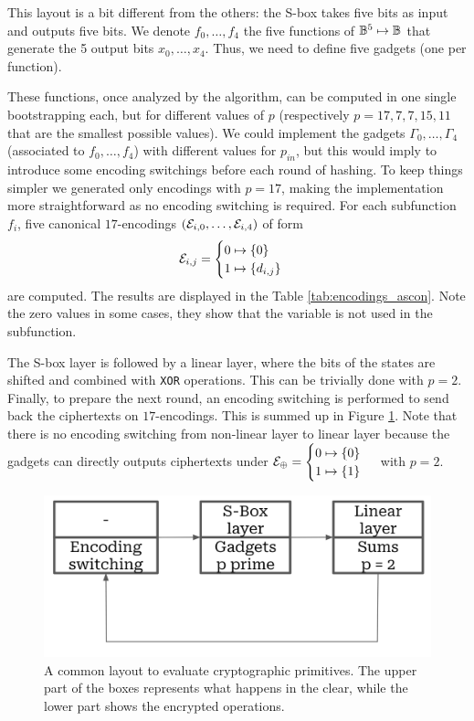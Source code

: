 This layout is a bit different from the others: the S-box takes five bits as input and outputs five bits. We denote $f_0, \dots, f_4$ the five functions of $\mathbb{B}^5 \mapsto \mathbb{B}$ that generate the 5 output bits $x_0, \dots, x_4$. Thus, we need to define five gadgets (one per function).

These functions, once analyzed by the algorithm, can be computed in one single bootstrapping each, but for different values of $p$ (respectively $p=17, 7, 7, 15, 11$ that are the smallest possible values). We could implement the gadgets $\Gamma_0, \dots, \Gamma_4$ (associated to $f_0, \dots, f_4$) with different values for $p_{in}$, but this would imply to introduce some encoding switchings before each round of hashing. To keep things simpler we generated only encodings with $p = 17$, making the implementation more straightforward as no encoding switching is required. For each subfunction $f_i$, five canonical $17$-encodings $(\mathcal{E}_{i, 0}, \dots, \mathcal{E}_{i, 4})$ of form $$\mathcal{E}_{i, j} = \begin{cases} 0 \mapsto \{0\} \\ 1 \mapsto \{d_{i,j}\} \end{cases}$$ are computed. The results are displayed in the Table \ref{tab:encodings_ascon}. Note the zero values in some cases, they show that the variable is not used in the subfunction. 

The S-box layer is followed by a linear layer, where the bits of the states are shifted and combined with \texttt{XOR} operations. This can be trivially done with $p=2$. Finally, to prepare the next round, an encoding switching is performed to send back the ciphertexts on $17$-encodings. This is summed up in Figure \ref{fig:layout_spn}. Note that there is no encoding switching from non-linear layer to linear layer because the gadgets can directly outputs ciphertexts under $\mathcal{E}_\oplus = \begin{cases} 0 \mapsto \{0\} \\ 1 \mapsto \{1\} \end{cases}$ with $p=2$.

\begin{figure}
    \centering
    \includegraphics[width=0.5\linewidth]{img/to_harmonize/layout_spn.png}
    \caption{A common layout to evaluate cryptographic primitives. The upper part of the boxes represents what happens in the clear, while the lower part shows the encrypted operations. }
    \label{fig:layout_spn}
\end{figure}


